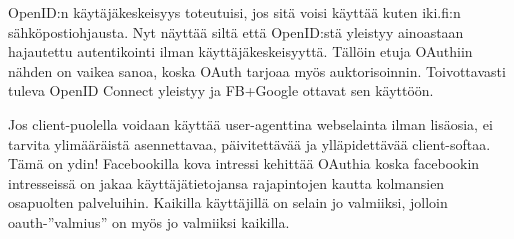 \documentclass[finnish,gradu]{tktltiki}
\begin{document}
    OpenID:n käytäjäkeskeisyys toteutuisi, jos sitä voisi käyttää kuten iki.fi:n sähköpostiohjausta. Nyt näyttää siltä että OpenID:stä yleistyy ainoastaan hajautettu autentikointi ilman käyttäjäkeskeisyyttä. Tällöin etuja OAuthiin nähden on vaikea sanoa, koska OAuth tarjoaa myös auktorisoinnin. Toivottavasti tuleva OpenID Connect yleistyy ja FB+Google ottavat sen käyttöön.

  Jos client-puolella voidaan käyttää user-agenttina webselainta ilman lisäosia, ei tarvita ylimääräistä asennettavaa, päivitettävää ja ylläpidettävää client-softaa. Tämä on ydin! Facebookilla kova intressi kehittää OAuthia koska facebookin intresseissä on jakaa käyttäjätietojansa rajapintojen kautta kolmansien osapuolten palveluihin. Kaikilla käyttäjillä on selain jo valmiiksi, jolloin oauth-''valmius'' on myös jo valmiiksi kaikilla.







\lastpage
\end{document}
